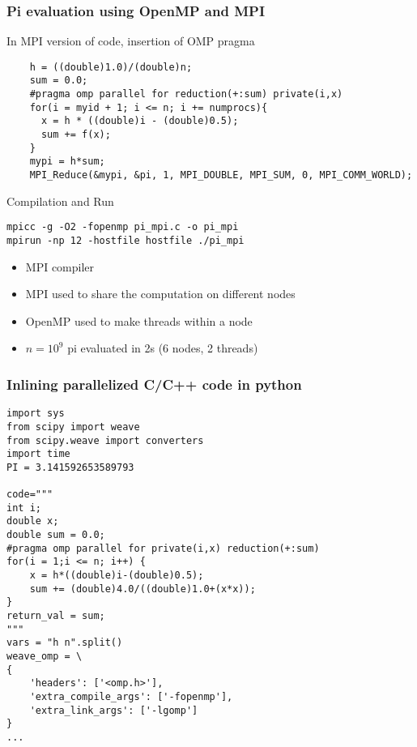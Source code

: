 \documentclass[12pt]{beamer}
\begin{document}
\begin{frame}[fragile]
  \frametitle{Pi evaluation using OpenMP and MPI}
  In MPI version of code, insertion of OMP pragma
  \begin{verbatim}
    h = ((double)1.0)/(double)n;
    sum = 0.0;
    #pragma omp parallel for reduction(+:sum) private(i,x)
    for(i = myid + 1; i <= n; i += numprocs){
      x = h * ((double)i - (double)0.5);
      sum += f(x);
    }
    mypi = h*sum;
    MPI_Reduce(&mypi, &pi, 1, MPI_DOUBLE, MPI_SUM, 0, MPI_COMM_WORLD);
  \end{verbatim}
\end{frame}

\begin{frame}[fragile]
  \begin{block}{Compilation and Run}
    \begin{verbatim}
mpicc -g -O2 -fopenmp pi_mpi.c -o pi_mpi
mpirun -np 12 -hostfile hostfile ./pi_mpi
    \end{verbatim}
  \end{block}
  \begin{block}{}
    \begin{itemize}[<+->]
    \item MPI compiler
    \item MPI used to share the computation on different nodes
    \item OpenMP used to make threads within a node
    \item $n = 10^9$ pi evaluated in 2s (6 nodes, 2 threads)
    \end{itemize}
  \end{block}
\end{frame}

\begin{frame}[fragile]
  \frametitle{Inlining parallelized C/C++ code in python}
  \begin{verbatim}
import sys
from scipy import weave
from scipy.weave import converters
import time
PI = 3.141592653589793

code="""
int i;
double x;
double sum = 0.0;
#pragma omp parallel for private(i,x) reduction(+:sum)
for(i = 1;i <= n; i++) {
    x = h*((double)i-(double)0.5);
    sum += (double)4.0/((double)1.0+(x*x));
}
return_val = sum;
"""
vars = "h n".split()
weave_omp = \
{
    'headers': ['<omp.h>'],
    'extra_compile_args': ['-fopenmp'],
    'extra_link_args': ['-lgomp']
}
...   
  \end{verbatim}
\end{frame}
\end{document}
